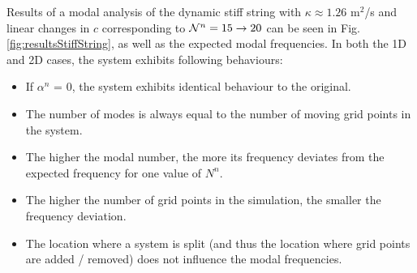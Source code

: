 \documentclass[fleqn]{jaes}
\begin{document}
Results of a modal analysis of the dynamic stiff string with $\kappa \approx 1.26$ m$^2$/s and linear changes in $c$ corresponding to $\mathcal{N}^n = 15 \rightarrow 20$ can be seen in Fig. \ref{fig:resultsStiffString}, as well as the expected modal frequencies. 
%
In both the 1D and 2D cases, the system exhibits following behaviours:
\begin{itemize}
    \item If $\alpha^n$ = 0, the system exhibits identical behaviour to the original. 
    \item The number of modes is always equal to the number of moving grid points in the system.
    \item The higher the modal number, the more its frequency deviates from the expected frequency for one value of $N^n$.
    \item The higher the number of grid points in the simulation, the smaller the frequency deviation.
    \item The location where a system is split (and thus the location where grid points are added / removed) does not influence the modal frequencies. 
\end{itemize}
\end{document}
